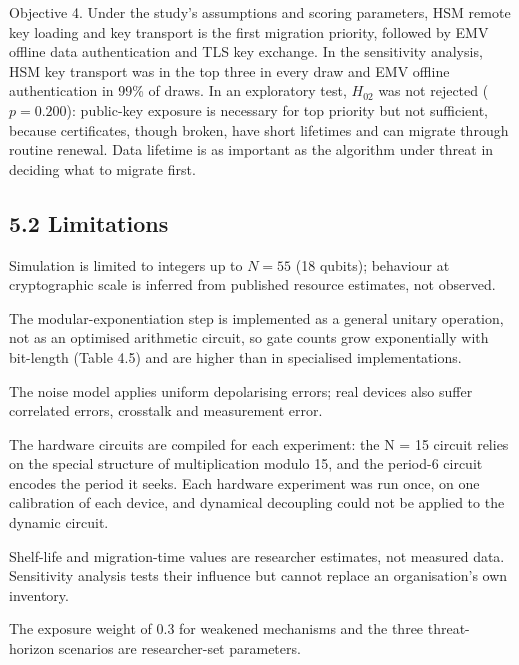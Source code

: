 \documentclass[12pt,oneside]{report}
\begin{document}
Objective 4. Under the study's assumptions and scoring parameters, HSM remote key loading and key transport is the first migration priority, followed by EMV offline data authentication and TLS key exchange. In the sensitivity analysis, HSM key transport was in the top three in every draw and EMV offline authentication in 99\% of draws. In an exploratory test, $H_{02}$ was not rejected ($p = 0.200$): public-key exposure is necessary for top priority but not sufficient, because certificates, though broken, have short lifetimes and can migrate through routine renewal. Data lifetime is as important as the algorithm under threat in deciding what to migrate first.
\par

\subsection*{5.2 Limitations}

Simulation is limited to integers up to $N = 55$ (18 qubits); behaviour at cryptographic scale is inferred from published resource estimates, not observed.
\par

The modular-exponentiation step is implemented as a general unitary operation, not as an optimised arithmetic circuit, so gate counts grow exponentially with bit-length (Table 4.5) and are higher than in specialised implementations.
\par

The noise model applies uniform depolarising errors; real devices also suffer correlated errors, crosstalk and measurement error.
\par

The hardware circuits are compiled for each experiment: the N = 15 circuit relies on the special structure of multiplication modulo 15, and the period-6 circuit encodes the period it seeks. Each hardware experiment was run once, on one calibration of each device, and dynamical decoupling could not be applied to the dynamic circuit.
\par

Shelf-life and migration-time values are researcher estimates, not measured data. Sensitivity analysis tests their influence but cannot replace an organisation’s own inventory.
\par

The exposure weight of 0.3 for weakened mechanisms and the three threat-horizon scenarios are researcher-set parameters.
\par
\end{document}
